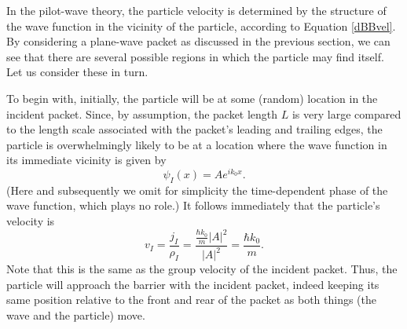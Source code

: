 \documentclass[aps,prc,twocolumn,letterpaper,floatfix]{revtex4}
\begin{document}
In the pilot-wave theory, the particle velocity is determined by the
structure of the wave function in the vicinity of the particle,
according to Equation \eqref{dBBvel}.  By considering a plane-wave
packet as discussed in the previous section, we can see that there are
several possible regions in which the particle may find itself.  Let
us consider these in turn.

To begin with, initially, the particle will be at some (random)
location in the incident packet.  Since, by assumption, the packet
length $L$ is very large compared to the length scale associated with
the packet's leading and trailing edges, the particle is
overwhelmingly likely to be at a location where the wave function in
its immediate vicinity is given by
\begin{equation}
\psi_I(x) = A e^{ik_0x}.
\end{equation}
(Here and subsequently we omit for simplicity the time-dependent phase
of the wave function, which plays no role.)  It follows immediately
that the particle's velocity is
\begin{equation}
v_I = \frac{j_I}{\rho_I} = \frac{\frac{\hbar k_0}{m}
  |A|^2}{|A|^2} = \frac{\hbar k_0}{m}.
\end{equation}
Note that this is the same as the group velocity of the incident
packet.  Thus, the particle will approach the barrier with the incident
packet, indeed keeping its same position relative to the front and
rear of the packet as both things (the wave and the particle) move.  
\end{document}

